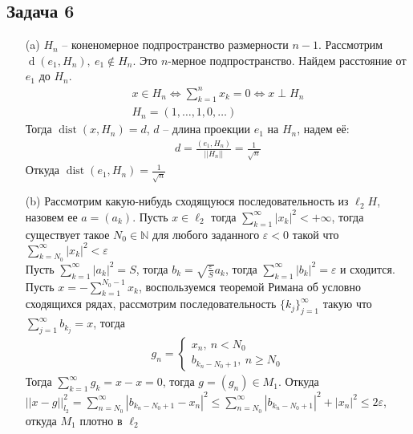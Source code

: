 \subsection*{Задача 6}
\begin{enumerate}
\item[(a)]
	$H_n$ -- коненомерное подпространство размерности $n-1$. Рассмотрим $\operatorname{d}(e_1, H_n),\ e_1 \notin H_n$. Это $n$-мерное подпространство. Найдем расстояние от $e_1$ до $H_n$.
	\begin{gather*}
		x \in H_n \Leftrightarrow \sum\limits_{k = 1}^{n} x_k = 0 \Leftrightarrow x \perp H_n\\
		H_n = (1, \ldots, 1, 0, \ldots)
	\end{gather*}
	Тогда $\operatorname{dist}(x, H_n) = d$, $d$ -- длина проекции $e_1$ на $H_n$, надем её:
	\begin{gather*}
		d = \frac{(e_1, H_n)}{||H_n||} = \frac{1}{\sqrt{n}}
	\end{gather*}
	Откуда $\operatorname{dist}(e_1, H_n) = \frac{1}{\sqrt{n}}$
\item[(b)]
	Рассмотрим какую-нибудь сходящуюся последовательность из $\ell_2{H}$, назовем ее $a = (a_k)$. Пусть $x \in \ell_2$ тогда $\sum\limits_{k = 1}^{\infty}|x_k|^2 < +\infty$, тогда существует такое $N_0 \in \mathbb{N}$ для любого заданного $\varepsilon < 0$ такой что $\sum\limits_{k = N_0}^{\infty}|x_k|^2 < \varepsilon$\\
	Пусть $\sum\limits_{k = 1}^{\infty}|a_k|^2 = S$, тогда $b_k = \sqrt{\frac{\varepsilon}{S}}a_k$, тогда $\sum\limits_{k = 1}^{\infty}|b_k|^2 = \varepsilon$ и сходится.\\
	Пусть $x = -\sum\limits_{k = 1}^{N_0 - 1}x_k$, воспользуемся теоремой Римана об условно сходящихся рядах, рассмотрим последовательность $\{k_j\}_{j = 1}^{\infty}$ такую что $\sum\limits_{j = 1}^{\infty}b_{k_j} = x$, тогда
	\begin{gather*}
		g_n =
		\begin{cases}
			x_n,\ n < N_0\\
			b_{k_n - N_0 + 1},\ n \geqslant N_0
		\end{cases}
	\end{gather*}
	Тогда $\sum\limits_{k = 1}^{\infty} g_k = x - x = 0$, тогда $g = (g_n) \in M_1$. Откуда $||x - g||_{l_2}^2 = \sum\limits_{n = N_0}^{\infty} |b_{k_n - N_0 + 1} - x_n|^2 \leqslant \sum\limits_{n = N_0}^{\infty} |b_{k_n - N_0 + 1}|^2 + |x_n|^2 \leqslant 2\varepsilon$, откуда $M_1$ плотно в $\ell_2$
\end{enumerate}
\vskip 0.4in

